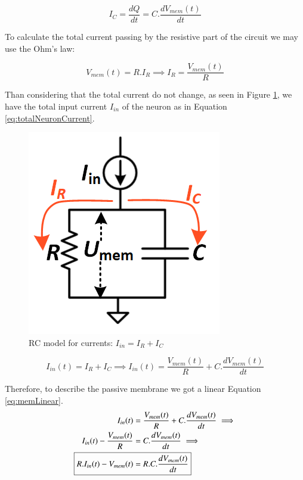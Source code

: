 			\begin{equation}
				\label{eq:rateOfChargeChange}
				I_C = \dfrac{dQ}{dt} = C. \dfrac{dV_{mem}(t)}{dt}
			\end{equation}
		
		
			\par To calculate the total current passing by the resistive part of the circuit we may use the Ohm's law:
			
			\begin{equation}
				\label{eq:ohmlaw}
				V_{mem}(t) = R.I_R \implies I_R = \frac{V_{mem}(t)}{R}
			\end{equation}
			
			\par Than considering that the total current do not change, as seen in Figure \ref{fig:rcmodel2}, we have the total input current $I_{in}$ of the neuron as in Equation \ref{eq:totalNeuronCurrent}.
			
			\begin{figure}[H]
				\centering
				\includegraphics[width=0.4\linewidth]{images/rcmodel2}
				\caption[RC model for currents]{RC model for currents: $I_{in} = I_R + I_C$}
				\label{fig:rcmodel2}
			\end{figure}
	
			\begin{equation}
				\label{eq:totalNeuronCurrent}
				I_{in}(t) = I_R + I_C \implies I_{in}(t) = \frac{V_{mem}(t)}{R} + C.\dfrac{dV_{mem}(t)}{dt}
			\end{equation}
			\par Therefore, to describe the passive membrane we got a linear Equation \ref{eq:memLinear}.
			\begin{equation}
				\label{eq:memLinear}
				\begin{aligned}
					I_{in}(t) &= \frac{V_{mem}(t)}{R} + C.\dfrac{dV_{mem}(t)}{dt} \implies \\ 
					I_{in}(t) - \frac{V_{mem}(t)}{R} &=  C.\dfrac{dV_{mem}(t)}{dt} \implies \\
					\Aboxed{R.I_{in}(t) - V_{mem}(t) &=  R.C.\dfrac{dV_{mem}(t)}{dt}}
				\end{aligned}
			\end{equation}
	
